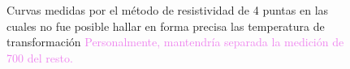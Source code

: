 \documentclass[12pt]{article}
\theoremstyle{definition}
\theoremstyle{remark}
\begin{document}
{\begin{figure}[H]
\centering
{} \\
\\
\caption{Curvas medidas por el método de resistividad de 4 puntas en las cuales no fue posible hallar en forma precisa las temperatura de transformación \textcolor{violet}{Personalmente, mantendría separada la medición de 700 del resto.}}
\label{Failures}
\end{figure}


}
\end{document}
